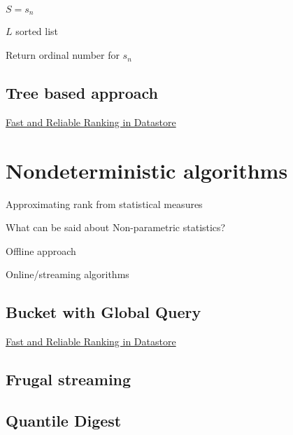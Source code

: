 $ S = { s_n } $

$ L $ sorted list

Return ordinal number for $s_n$

\subsection{Tree based approach}

\href{https://cloud.google.com/datastore/docs/articles/fast-and-reliable-ranking-in-datastore/}{Fast and Reliable Ranking in Datastore} 


\section{Nondeterministic algorithms}

\begin{shaded}
 Approximating rank from statistical measures

 What can be said about Non-parametric statistics?

 Offline approach

 Online/streaming algorithms
\end{shaded}

\subsection{Bucket with Global Query}

\href{https://cloud.google.com/datastore/docs/articles/fast-and-reliable-ranking-in-datastore/}{Fast and Reliable Ranking in Datastore} 


\subsection{Frugal streaming}

\cite{frugal_streaming}

\subsection{Quantile Digest}

\cite{quantile_digest}
